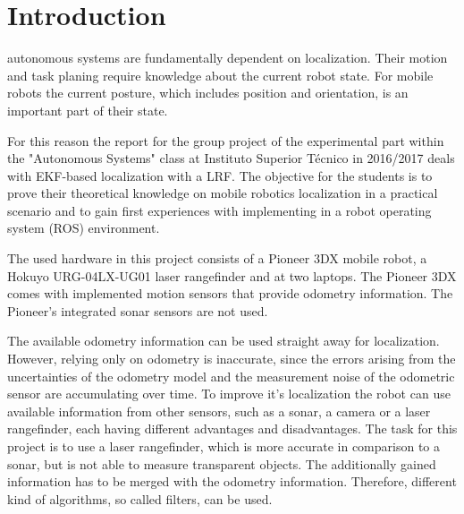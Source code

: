 \section{Introduction}
\label{sec:Introduction}


% 
% 
% 
% 
 autonomous systems are fundamentally dependent on localization. Their motion and task planing require knowledge about the current robot state. For mobile robots the current posture, which includes position and orientation, is an important part of their state. 

For this reason the report for the group project of the experimental part within the "Autonomous Systems" class at Instituto Superior T\'{e}cnico in 2016/2017 deals with EKF-based localization with a LRF. The objective for the students is to prove their theoretical knowledge on mobile robotics localization in a practical scenario and to gain first experiences with implementing in a robot operating system (ROS) environment. 

The used hardware in this project consists of a Pioneer 3DX mobile robot, a Hokuyo URG-04LX-UG01 laser rangefinder and at two laptops. The Pioneer 3DX comes with implemented motion sensors that provide odometry information. The Pioneer's integrated sonar sensors are not used.

The available odometry information can be used straight away for localization. However, relying only on odometry is inaccurate, since the errors arising from the uncertainties of the odometry model and the measurement noise of the odometric sensor are accumulating over time. To improve it's  localization the robot can use available information from other sensors, such as a sonar, a camera or a laser rangefinder, each having different advantages and disadvantages.  The task for this project is to use a laser rangefinder, which is more accurate in comparison to a sonar, but is not able to measure transparent objects. The additionally gained information has to be merged with the odometry information. Therefore, different kind of algorithms, so called filters, can be used.

